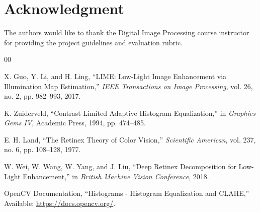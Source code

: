 \documentclass[11pt]{article}
\begin{document}
\section*{Acknowledgment}
The authors would like to thank the Digital Image Processing course instructor for providing the project guidelines and evaluation rubric.

\begin{thebibliography}{00}

X. Guo, Y. Li, and H. Ling, ``LIME: Low-Light Image Enhancement via Illumination Map Estimation,'' \textit{IEEE Transactions on Image Processing}, vol. 26, no. 2, pp. 982--993, 2017.

K. Zuiderveld, ``Contrast Limited Adaptive Histogram Equalization,'' in \textit{Graphics Gems IV}, Academic Press, 1994, pp. 474--485.

E. H. Land, ``The Retinex Theory of Color Vision,'' \textit{Scientific American}, vol. 237, no. 6, pp. 108--128, 1977.

W. Wei, W. Wang, W. Yang, and J. Liu, ``Deep Retinex Decomposition for Low-Light Enhancement,'' in \textit{British Machine Vision Conference}, 2018.

OpenCV Documentation, ``Histograms - Histogram Equalization and CLAHE,'' Available: \url{https://docs.opencv.org/}.

\end{thebibliography}
\end{document}
